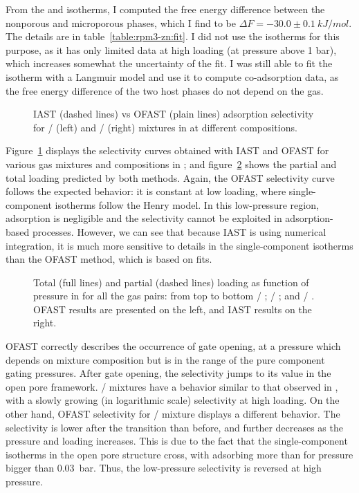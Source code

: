 \documentclass[thesis]{subfiles}
\begin{document}
From the  and  isotherms, I computed the free energy
difference between the nonporous and microporous phases, which I find to be
$\Delta F = -30.0 \pm \SI{0.1}{kJ/mol}$. The details are in
table~\ref{table:rpm3-zn:fit}. I did not use the  isotherms for this
purpose, as it has only limited data at high loading (at pressure above 1 bar),
which increases somewhat the uncertainty of the fit. I was still able to fit the
 isotherm with a Langmuir model and use it to compute co-adsorption
data, as the free energy difference of the two host phases do not depend on the
gas.

\begin{figure}[htp]
    \centering
    
    \caption{IAST (dashed lines) vs OFAST (plain lines) adsorption selectivity
    for / (left) and / (right) mixtures
    in \RPMZn at different compositions.}
    \label{fig:rpm3-zn:iast-ofast:selectivity}
\end{figure}

Figure~\ref{fig:rpm3-zn:iast-ofast:selectivity} displays the selectivity curves
obtained with IAST and OFAST for various gas mixtures and compositions in
\RPMZn; and figure~\ref{fig:rpm3-zn:iast-ofast:loadings} shows the partial and
total loading predicted by both methods. Again, the OFAST selectivity curve
follows the expected behavior: it is constant at low loading, where
single-component isotherms follow the Henry model. In this low-pressure region,
adsorption is negligible and the selectivity cannot be exploited in
adsorption-based processes. However, we can see that because IAST is using
numerical integration, it is much more sensitive to details in the
single-component isotherms than the OFAST method, which is based on fits.

\begin{figure}[htp]
    \centering
    
    \caption{Total (full lines) and partial (dashed lines) loading as function
    of pressure in \RPMZn for all the gas pairs: from top to bottom  /
    ;  / ; and  / . OFAST results
    are presented on the left, and IAST results on the right.}
    \label{fig:rpm3-zn:iast-ofast:loadings}
\end{figure}

OFAST correctly describes the occurrence of gate opening, at a pressure which
depends on mixture composition but is in the range of the pure component gating
pressures. After gate opening, the selectivity jumps to its value in the open
pore framework. / mixtures have a behavior similar to that
observed in \Cudhbc, with a slowly growing (in logarithmic scale) selectivity at
high loading. On the other hand, OFAST selectivity for /
mixture displays a different behavior. The selectivity is lower after the
transition than before, and further decreases as the pressure and loading
increases. This is due to the fact that the single-component isotherms  in the
open pore structure cross, with  adsorbing more than  for
pressure bigger than \SI{0.03}{bar}. Thus, the low-pressure selectivity is
reversed at high pressure.
\end{document}
